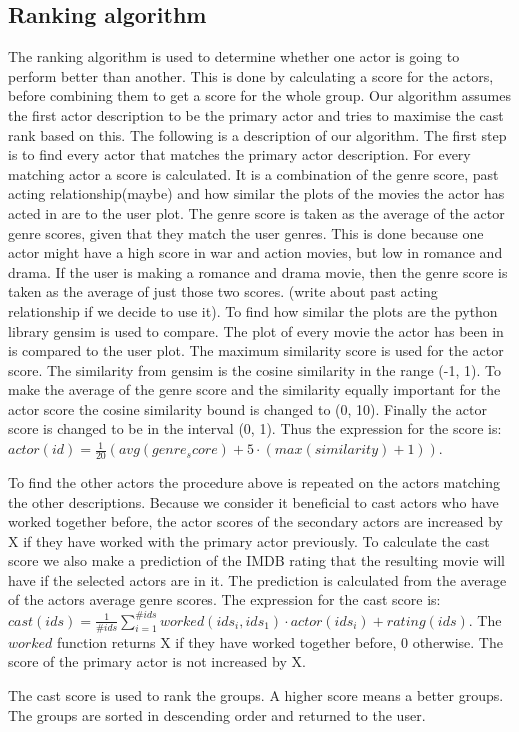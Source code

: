 \subsection{Ranking algorithm}
The ranking algorithm is used to determine whether one actor is going to perform better than another. This is done by calculating a score for the actors, before combining them to get a score for the whole group. Our algorithm assumes the first actor description to be the primary actor and tries to maximise the cast rank based on this. The following is a description of our algorithm. The first step is to find every actor that matches the primary actor description. For every matching actor a score is calculated. It is a combination of the genre score, past acting relationship(maybe) and how similar the plots of the movies the actor has acted in are to the user plot. The genre score is taken as the average of the actor genre scores, given that they match the user genres. This is done because one actor might have a high score in war and action movies, but low in romance and drama. If the user is making a romance and drama movie, then the genre score is taken as the average of just those two scores. (write about past acting relationship if we decide to use it). To find how similar the plots are the python library gensim is used to compare. The plot of every movie the actor has been in is compared to the user plot. The maximum similarity score is used for the actor score. The similarity from gensim is the cosine similarity in the range (-1, 1). To make the average of the genre score and the similarity equally important for the actor score the cosine similarity bound is changed to (0, 10). Finally the actor score is changed to be in the interval (0, 1). Thus the expression for the score is: $actor(id)=\frac{1}{20}(avg(genre_score) + 5\cdot(max(similarity)+1))$.

To find the other actors the procedure above is repeated on the actors matching the other descriptions. Because we consider it beneficial to cast actors who have worked together before, the actor scores of the secondary actors are increased by X if they have worked with the primary actor previously. To calculate the cast score we also make a prediction of the IMDB rating that the resulting movie will have if the selected actors are in it. The prediction is calculated from the average of the actors average genre scores. The expression for the cast score is: $cast(ids)=\frac{1}{\#ids}\sum_{i=1}^{\#ids}worked(ids_i, ids_1)\cdot actor(ids_i) + rating(ids)$. The $worked$ function returns X if they have worked together before, 0 otherwise. The score of the primary actor is not increased by X.

The cast score is used to rank the groups. A higher score means a better groups. The groups are sorted in descending order and returned to the user.